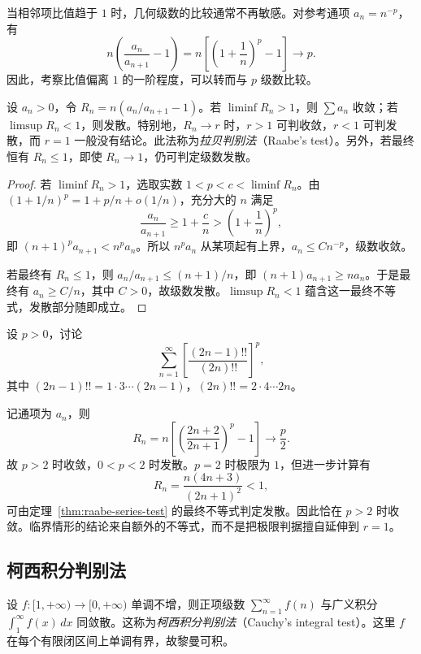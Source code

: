 \documentclass[UTF8,12pt,a4paper,fontset=fandol]{ctexbook}
\begin{document}
当相邻项比值趋于 $1$ 时，几何级数的比较通常不再敏感。对参考通项 $a_n=n^{-p}$，有
\[
    n\left(\frac{a_n}{a_{n+1}}-1\right)
    =n\left[\left(1+\frac1n\right)^p-1\right]\longrightarrow p.
\]
因此，考察比值偏离 $1$ 的一阶程度，可以转而与 $p$ 级数比较。

\begin{theorem}[拉贝判别法]
\label{thm:raabe-series-test}
设 $a_n>0$，令 $R_n=n(a_n/a_{n+1}-1)$。若 $\liminf R_n>1$，则 $\sum a_n$ 收敛；若 $\limsup R_n<1$，则发散。特别地，$R_n\to r$ 时，$r>1$ 可判收敛，$r<1$ 可判发散，而 $r=1$ 一般没有结论。此法称为\emph{拉贝判别法}（Raabe's test）。另外，若最终恒有 $R_n\leq1$，即使 $R_n\to1$，仍可判定级数发散。
\end{theorem}

\begin{proof}
若 $\liminf R_n>1$，选取实数 $1<p<c<\liminf R_n$。由 $(1+1/n)^p=1+p/n+o(1/n)$，充分大的 $n$ 满足
\[
    \frac{a_n}{a_{n+1}}\geq1+\frac cn
      >\left(1+\frac1n\right)^p,
\]
即 $(n+1)^pa_{n+1}<n^pa_n$。所以 $n^pa_n$ 从某项起有上界，$a_n\leq Cn^{-p}$，级数收敛。

若最终有 $R_n\leq1$，则 $a_n/a_{n+1}\leq(n+1)/n$，即 $(n+1)a_{n+1}\geq na_n$。于是最终有 $a_n\geq C/n$，其中 $C>0$，故级数发散。$\limsup R_n<1$ 蕴含这一最终不等式，发散部分随即成立。
\end{proof}

\begin{example}
\label{ex:raabe-double-factorial-series}
设 $p>0$，讨论
\[
    \sum_{n=1}^{\infty}\left[\frac{(2n-1)!!}{(2n)!!}\right]^p,
\]
其中 $(2n-1)!!=1\cdot3\cdots(2n-1)$，$(2n)!!=2\cdot4\cdots2n$。
\end{example}

\begin{solve}
记通项为 $a_n$，则
\[
    R_n=n\left[\left(\frac{2n+2}{2n+1}\right)^p-1\right]
        \longrightarrow\frac p2.
\]
故 $p>2$ 时收敛，$0<p<2$ 时发散。$p=2$ 时极限为 $1$，但进一步计算有
\[
    R_n=\frac{n(4n+3)}{(2n+1)^2}<1,
\]
可由定理~\ref{thm:raabe-series-test} 的最终不等式判定发散。因此恰在 $p>2$ 时收敛。临界情形的结论来自额外的不等式，而不是把极限判据擅自延伸到 $r=1$。
\end{solve}

\subsection{柯西积分判别法}
\label{subsec:cauchy-integral-test}

\begin{theorem}[柯西积分判别法]
\label{thm:cauchy-integral-test-for-series}
设 $f:[1,+\infty)\to[0,+\infty)$ 单调不增，则正项级数 $\sum_{n=1}^{\infty}f(n)$ 与广义积分 $\int_1^{\infty}f(x)\,dx$ 同敛散。这称为\emph{柯西积分判别法}（Cauchy's integral test）。这里 $f$ 在每个有限闭区间上单调有界，故黎曼可积。
\end{theorem}
\end{document}
